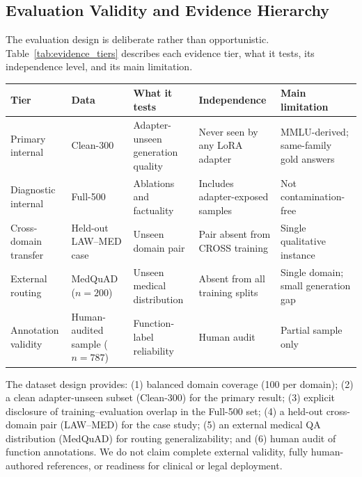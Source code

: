 \documentclass[a4paper,fleql,doubleblind]{cas-sc}
\begin{document}
\subsection{Evaluation Validity and Evidence Hierarchy}
\label{ssec:eval_hierarchy}

The evaluation design is deliberate rather than opportunistic.
Table~\ref{tab:evidence_tiers} describes each evidence tier, what it tests,
its independence level, and its main limitation.

\vspace{4pt}
\begin{center}
\begingroup
\renewcommand{\arraystretch}{1.25}
\label{tab:evidence_tiers}
\small
\begin{tabular}{l p{2.2cm} p{2.8cm} p{2.5cm} p{2.5cm}}
\toprule
\textbf{Tier} & \textbf{Data} & \textbf{What it tests} & \textbf{Independence} & \textbf{Main limitation} \\
\midrule
Primary internal & Clean-300 & Adapter-unseen generation quality & Never seen by any LoRA adapter & MMLU-derived; same-family gold answers \\
Diagnostic internal & Full-500 & Ablations and factuality & Includes adapter-exposed samples & Not contamination-free \\
Cross-domain transfer & Held-out LAW--MED case & Unseen domain pair & Pair absent from CROSS training & Single qualitative instance \\
External routing & MedQuAD ($n{=}200$) & Unseen medical distribution & Absent from all training splits & Single domain; small generation gap \\
Annotation validity & Human-audited sample ($n{=}787$) & Function-label reliability & Human audit & Partial sample only \\
\bottomrule
\end{tabular}
\endgroup
\end{center}
\vspace{4pt}

\noindent
The dataset design provides: (1) balanced domain coverage (100 per domain);
(2) a clean adapter-unseen subset (Clean-300) for the primary result;
(3) explicit disclosure of training--evaluation overlap in the Full-500 set;
(4) a held-out cross-domain pair (LAW--MED) for the case study;
(5) an external medical QA distribution (MedQuAD) for routing generalizability;
and (6) human audit of function annotations.
We do not claim complete external validity, fully human-authored references,
or readiness for clinical or legal deployment.
\end{document}
